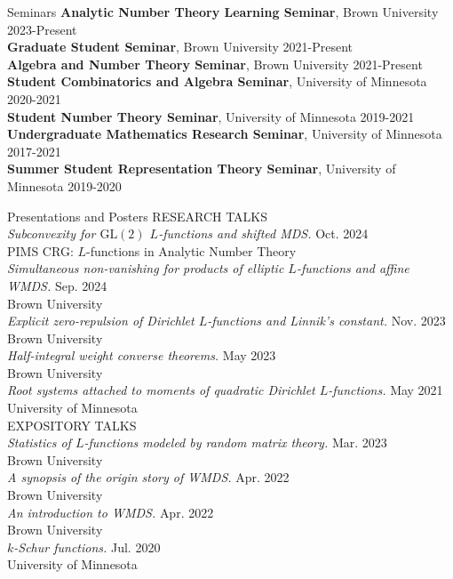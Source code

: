 \documentclass{resume} %
\begin{document}
\begin{rSection}{Seminars}
    {\bf Analytic Number Theory Learning Seminar}, Brown University \hfill {2023-Present} \\
    {\bf Graduate Student Seminar}, Brown University \hfill {2021-Present} \\
    {\bf Algebra and Number Theory Seminar}, Brown University \hfill {2021-Present} \\
    {\bf Student Combinatorics and Algebra Seminar}, University of Minnesota \hfill {2020-2021} \\
    {\bf Student Number Theory Seminar}, University of Minnesota \hfill {2019-2021} \\
    {\bf Undergraduate Mathematics Research Seminar}, University of Minnesota \hfill {2017-2021} \\
    {\bf Summer Student Representation Theory Seminar}, University of Minnesota \hfill {2019-2020} \\
\end{rSection}

\begin{rSection}{Presentations and Posters}
    RESEARCH TALKS \\
    {\em Subconvexity for $\mathrm{GL}(2)$ $L$-functions and shifted MDS.} \hfill {Oct. 2024} \\
    \hphantom{\quad}PIMS CRG: $L$-functions in Analytic Number Theory \\
    {\em Simultaneous non-vanishing for products of elliptic $L$-functions and affine WMDS.} \hfill {Sep. 2024} \\
    \hphantom{\quad}Brown University \\
    {\em Explicit zero-repulsion of Dirichlet $L$-functions and Linnik's constant.} \hfill {Nov. 2023} \\
    \hphantom{\quad}Brown University \\
    {\em Half-integral weight converse theorems.} \hfill {May 2023} \\
    \hphantom{\quad}Brown University \\
    {\em Root systems attached to moments of quadratic Dirichlet $L$-functions.} \hfill {May 2021} \\
    \hphantom{\quad}University of Minnesota \\

    EXPOSITORY TALKS \\
    {\em Statistics of $L$-functions modeled by random matrix theory.} \hfill {Mar. 2023} \\ 
    \hphantom{\quad}Brown University \\
    {\em A synopsis of the origin story of WMDS.} \hfill {Apr. 2022} \\
    \hphantom{\quad}Brown University \\
    {\em An introduction to WMDS.} \hfill {Apr. 2022} \\
    \hphantom{\quad}Brown University \\
    {\em $k$-Schur functions.} \hfill {Jul. 2020} \\ 
    \hphantom{\quad}University of Minnesota \\
\end{rSection}
\end{document}
